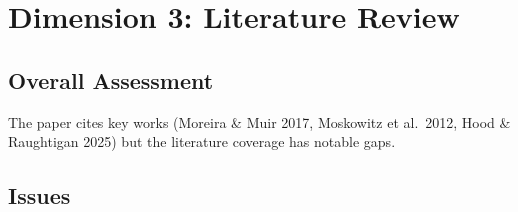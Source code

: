 \documentclass[12pt,a4paper]{article}
\begin{document}
\section{Dimension 3: Literature Review}

\subsection*{Overall Assessment}
The paper cites key works (Moreira \& Muir 2017, Moskowitz et al.\ 2012, Hood \& Raughtigan 2025) but the literature coverage has notable gaps.

\subsection*{Issues}
\end{document}
